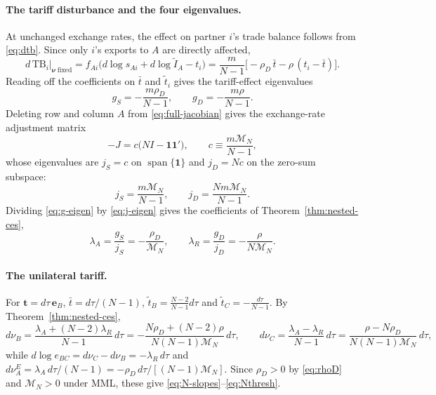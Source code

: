 \documentclass[11pt]{article}
\begin{document}
\paragraph{The tariff disturbance and the four eigenvalues.}
At unchanged exchange rates, the effect on partner $i$'s trade balance follows from \eqref{eq:dtb}. Since only $i$'s exports to $A$ are directly affected,
\begin{equation}
d\,\mathrm{TB}_i\big|_{\boldsymbol{\nu}\ \mathrm{fixed}}
=f_{Ai}\big(d\log s_{Ai}+d\log\widetilde I_A-t_i\big)
=\frac{m}{N-1}\Big[-\rho_D\,\bar t-\rho\,(t_i-\bar t)\Big].
\label{eq:impact-chain}
\end{equation}
Reading off the coefficients on $\bar t$ and $\tilde t_i$ gives the tariff-effect eigenvalues
\begin{equation}
g_S=-\frac{m\rho_D}{N-1}, \qquad
g_D=-\frac{m\rho}{N-1}.
\label{eq:g-eigen}
\end{equation}
Deleting row and column $A$ from \eqref{eq:full-jacobian} gives the exchange-rate adjustment matrix
\begin{equation}
-J=c\big(NI-\mathbf{1}\mathbf{1}'\big), \qquad
c\equiv\frac{m\mathcal M_N}{N-1},
\label{eq:J-matrix}
\end{equation}
whose eigenvalues are $j_S=c$ on $\operatorname{span}\{\mathbf 1\}$ and $j_D=Nc$ on the zero-sum subspace:
\begin{equation}
j_S=\frac{m\mathcal M_N}{N-1}, \qquad
j_D=\frac{Nm\mathcal M_N}{N-1}.
\label{eq:j-eigen}
\end{equation}
Dividing \eqref{eq:g-eigen} by \eqref{eq:j-eigen} gives the coefficients of Theorem~\ref{thm:nested-ces},
\[
\lambda_A=\frac{g_S}{j_S}=-\frac{\rho_D}{\mathcal M_N},
\qquad
\lambda_R=\frac{g_D}{j_D}=-\frac{\rho}{N\mathcal M_N}.
\]

\paragraph{The unilateral tariff.}
For $\mathbf t=d\tau\,\mathbf{e}_B$, $\bar t=d\tau/(N-1)$, $\tilde t_B=\frac{N-2}{N-1}d\tau$ and $\tilde t_C=-\frac{d\tau}{N-1}$. By Theorem~\ref{thm:nested-ces},
\[
d\nu_B=\frac{\lambda_A+(N-2)\lambda_R}{N-1}\,d\tau=-\frac{N\rho_D+(N-2)\rho}{N(N-1)\mathcal M_N}\,d\tau,
\qquad
d\nu_C=\frac{\lambda_A-\lambda_R}{N-1}\,d\tau=\frac{\rho-N\rho_D}{N(N-1)\mathcal M_N}\,d\tau,
\]
while $d\log e_{BC}=d\nu_C-d\nu_B=-\lambda_R\,d\tau$ and $d\nu_A^E=\lambda_A\,d\tau/(N-1)=-\rho_D\,d\tau/[(N-1)\mathcal M_N]$. Since $\rho_D>0$ by \eqref{eq:rhoD} and $\mathcal M_N>0$ under MML, these give \eqref{eq:N-slopes}--\eqref{eq:Nthresh}.
\end{document}
